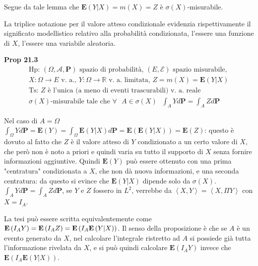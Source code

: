 \documentclass{article}
\begin{document}
Segue da tale lemma che $\mathbf{E}\left( Y|X\right) =m\left( X\right) =Z$ 
\`{e} $\sigma \left( X\right) $-misurabile.

La triplice notazione per il valore atteso condizionale evidenzia
rispettivamente il significato modellistico relativo alla probabilit\`{a}
condizionata, l'essere una funzione di $X$, l'essere una variabile aleatoria.

\textbf{Prop 21.3 }%
\begin{gather*}
\text{Hp}\text{: }\left( \Omega ,\mathcal{A},\mathbf{P}\right) \text{ spazio
di probabilit\`{a}, }\left( E,\mathcal{E}\right) \text{ spazio misurabile, }
\\
X:\Omega \rightarrow E\text{ v. a., }Y:\Omega \rightarrow 
\mathbb{R}
\text{ v. a. limitata, }Z=m\left( X\right) =\mathbf{E}\left( Y|X\right) \\
\text{Ts}\text{: }Z\text{ \`{e} l'unica (a meno di eventi trascurabili) v.
a. reale } \\
\sigma \left( X\right) \text{-misurabile tale che }\forall \text{ }A\in
\sigma \left( X\right) \text{ }\int_{A}Yd\mathbf{P}=\int_{A}Zd\mathbf{P}
\end{gather*}

Nel caso di $A=\Omega $ $\int_{\Omega }Yd\mathbf{P}=\mathbf{E}\left(
Y\right) =\int_{\Omega }\mathbf{E}\left( Y|X\right) d\mathbf{P=E}\left( 
\mathbf{E}\left( Y|X\right) \right) =\mathbf{E}\left( Z\right) $: questo 
\`{e} dovuto al fatto che $Z$ \`{e} il valore atteso di $Y$ condizionato a
un certo valore di $X$, che per\`{o} non \`{e} noto a priori e quindi varia
su tutto il supporto di $X$ senza fornire informazioni aggiuntive. Quindi $%
\mathbf{E}\left( Y\right) $ pu\`{o} essere ottenuto con una prima
"centratura" condizionata a $X$, che non d\`{a} nuova informazioni, e una
seconda centratura: da questo si evince che $\mathbf{E}\left( Y|X\right) $
dipende solo da $\sigma \left( X\right) $. $\int_{A}Yd\mathbf{P}=\int_{A}Zd%
\mathbf{P}$, se $Y$ e $Z$ fossero in $L^{2}$, verrebbe da $\left\langle
X,Y\right\rangle =\left\langle X,\Pi Y\right\rangle $ con $X=I_{A}$.

La tesi pu\`{o} essere scritta equivalentemente come $\mathbf{E}\left(
I_{A}Y\right) =\mathbf{E}\left( I_{A}Z\right) =\mathbf{E}\left( I_{A}\mathbf{%
E}\left( Y|X\right) \right) $. Il senso della proposizione \`{e} che se $A$ 
\`{e} un evento generato da $X$, nel calcolare l'integrale ristretto ad $A$
si possiede gi\`{a} tutta l'informazione rivelata da $X$, e si pu\`{o}
quindi calcolare $\mathbf{E}\left( I_{A}Y\right) $ invece che $\mathbf{E}%
\left( I_{A}\mathbf{E}\left( Y|X\right) \right) $.
\end{document}
